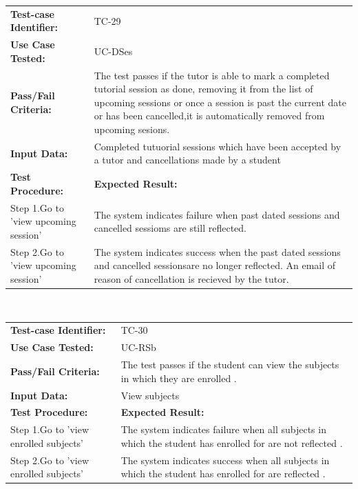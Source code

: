 \documentclass[12pt]{article}
\begin{document}
{\begin{tabular}{| p{8cm} | p{8cm} |} \hline
	\textbf{Test-case Identifier:}& TC-29\\
	\textbf{Use Case Tested:}& UC-DSes\\
	\textbf{Pass/Fail Criteria:}& The test passes if the tutor is able to mark a completed tutorial session as done, removing it from the list of upcoming sessions or once a session is past the current date or has been cancelled,it is automatically removed from upcoming sesions.\\
	\textbf{Input Data:}& Completed tutuorial sessions which have been accepted by a tutor and cancellations made by a student\\\hline
	\textbf{Test Procedure:}& \textbf{Expected Result:} \\\hline
	Step 1.Go to 'view upcoming session' & The system indicates failure when past dated sessions and cancelled sessioms are still reflected. \\
	Step 2.Go to 'view upcoming session' & The system indicates success when the past dated sessions and cancelled sessionsare no longer reflected. An email of reason of cancellation is recieved by the tutor.\\
		\hline
\end{tabular}
\\

\begin{tabular}{| p{8cm} | p{8cm} |} \hline
	\textbf{Test-case Identifier:}& TC-30\\
	\textbf{Use Case Tested:}& UC-RSb\\
	\textbf{Pass/Fail Criteria:}& The test passes if the student can view the  subjects in which they are enrolled .\\
	\textbf{Input Data:}& View subjects\\\hline
	\textbf{Test Procedure:}& \textbf{Expected Result:} \\\hline
	Step 1.Go to 'view enrolled subjects' & The system indicates failure when all subjects in which the student has enrolled for are not reflected . \\
	Step 2.Go to 'view enrolled subjects' & The system indicates success when all subjects in which the student has enrolled for are  reflected . \\
		\hline
\end{tabular}
\\


}
\end{document}
